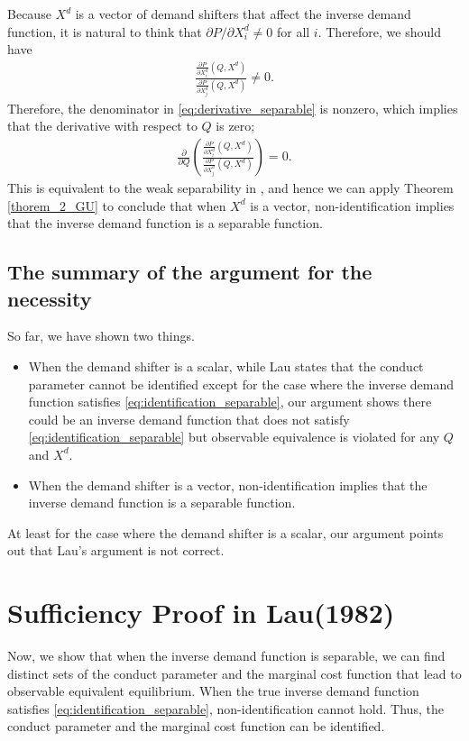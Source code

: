 \documentclass[11pt, a4paper]{article}
\theoremstyle{remark}
\begin{document}
Because $X^{d}$ is a vector of demand shifters that affect the inverse demand function, it is natural to think that $\partial P/\partial X^{d}_{i} \ne 0$ for all $i$.
Therefore, we should have
\begin{align}
    \frac{\frac{\partial P}{\partial X^{d}_{i}}(Q, X^{d})}{\frac{\partial P}{\partial X^{d}_{j}}(Q, X^{d})} \ne 0.
\end{align}
Therefore, the denominator in \eqref{eq:derivative_separable} is nonzero, which implies that the derivative with respect to $Q$ is zero;
\begin{align}
    \frac{\partial}{\partial Q} \left(\frac{\frac{\partial P}{\partial X^{d}_{i}}(Q, X^{d})}{\frac{\partial P}{\partial X^{d}_{j}}(Q, X^{d})}\right) = 0.
\end{align}
This is equivalent to the weak separability in \citet{goldmanNote1964}, and hence we can apply Theorem \ref{thorem_2_GU} to conclude that when $X^{d}$ is a vector, non-identification implies that the inverse demand function is a separable function.



\subsection{The summary of the argument for the necessity}
So far, we have shown two things.
\begin{itemize}
    \item When the demand shifter is a scalar, while Lau states that the conduct parameter cannot be identified except for the case where the inverse demand function satisfies \eqref{eq:identification_separable}, our argument shows there could be an inverse demand function that does not satisfy \eqref{eq:identification_separable} but observable equivalence is violated for any $Q$ and $X^{d}$.
    \item When the demand shifter is a vector, non-identification implies that the inverse demand function is a separable function.
\end{itemize}
At least for the case where the demand shifter is a scalar, our argument points out that Lau's argument is not correct.



\section{Sufficiency Proof in Lau(1982)}\label{sec:proof_lau_sufficiency}
Now, we show that when the inverse demand function is separable, we can find distinct sets of the conduct parameter and the marginal cost function that lead to observable equivalent equilibrium.
When the true inverse demand function satisfies \eqref{eq:identification_separable}, non-identification cannot hold.
Thus, the conduct parameter and the marginal cost function can be identified.
\end{document}
